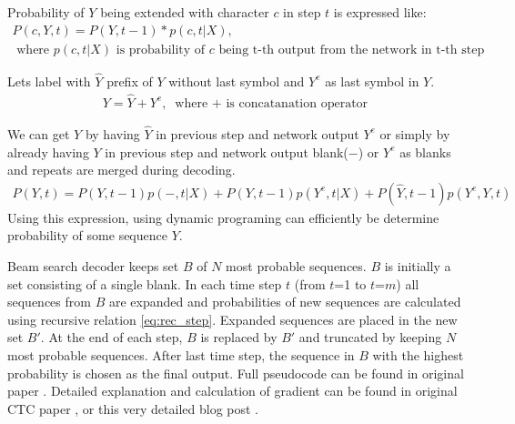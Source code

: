 \documentclass[times, utf8, diplomski, numeric, english]{fer}
\begin{document}
Probability of $Y$ being extended with character $c$ in step $t$ is expressed like:
\begin{equation}
\begin{gathered}
P(c, Y, t) = P(Y, t-1) * p(c, t|X), \\\text{~where $p(c, t|X)$ is probability of $c$ being t-th output from the network in t-th step}.
\end{gathered}
\end{equation}

Lets label  with $\hat{Y}$ prefix of $Y$ without last symbol and $Y^e$ as last symbol in $Y$.
\begin{equation}
\begin{gathered}
Y = \hat{Y} + Y^e, \text{~where $+$ is concatanation operator}
\end{gathered}
\end{equation}


We can get $Y$ by having $\hat{Y}$ in previous step and network output $Y^e$ or simply by
already having $Y$ in previous step and network output blank($-$) or $Y^e$ as blanks and repeats are merged during decoding.
\begin{equation}
\begin{gathered}
\label{eq:rec_step}
P(Y, t) = P(Y, t-1) p(-, t|X) +  P(Y, t-1)  p(Y^e, t|X) +  P(\hat{Y}, t-1)  p(Y^e, Y, t) 
\end{gathered}
\end{equation}
Using this expression, using dynamic programing can efficiently be determine probability of some sequence $Y$.

Beam search decoder keeps set $B$ of $N$ most probable sequences. $B$ is initially a set consisting of a single blank. In each time step $t$ (from $t$=1 to $t$=$m$) all sequences from $B$ are expanded and probabilities of new sequences are calculated using recursive relation \ref{eq:rec_step}. Expanded sequences are placed in the new set $B'$. At the end of each step, $B$ is replaced by $B'$ and truncated by keeping $N$ most probable sequences. 
After last time step, the sequence in $B$ with the highest probability is chosen as the final output.
Full pseudocode can be found in original paper \cite{graves_decode}. 
Detailed explanation and calculation of gradient can be found in original CTC paper \cite{Graves:2006:CTC:1143844.1143891}, or this very detailed blog post \cite{ctc-blog}.
\end{document}
